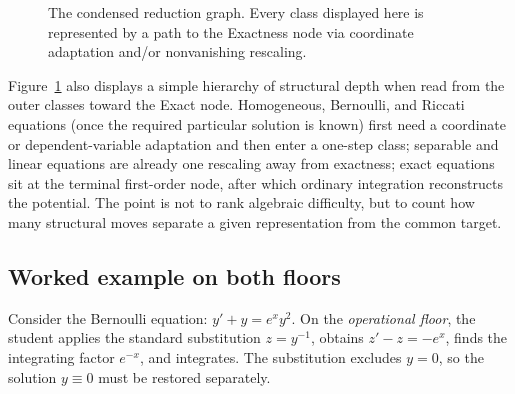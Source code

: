 \documentclass[11pt]{article}
\theoremstyle{definition}
\begin{document}
\begin{figure}[ht]
\centering
{}
\caption{The condensed reduction graph. Every class displayed here is represented by a path to the Exactness node via coordinate adaptation and/or nonvanishing rescaling.}
\label{fig:graph}
\end{figure}

Figure~\ref{fig:graph} also displays a simple hierarchy of structural depth when read from the outer classes toward the Exact node. Homogeneous, Bernoulli, and Riccati equations (once the required particular solution is known) first need a coordinate or dependent-variable adaptation and then enter a one-step class; separable and linear equations are already one rescaling away from exactness; exact equations sit at the terminal first-order node, after which ordinary integration reconstructs the potential. The point is not to rank algebraic difficulty, but to count how many structural moves separate a given representation from the common target.

\subsection*{Worked example on both floors}
Consider the Bernoulli equation: \(y'+y=e^x y^2\).
On the \emph{operational floor}, the student applies the standard substitution \(z=y^{-1}\), obtains \(z'-z=-e^x\), finds the integrating factor \(e^{-x}\), and integrates. The substitution excludes \(y=0\), so the solution \(y\equiv0\) must be restored separately. 
\end{document}
